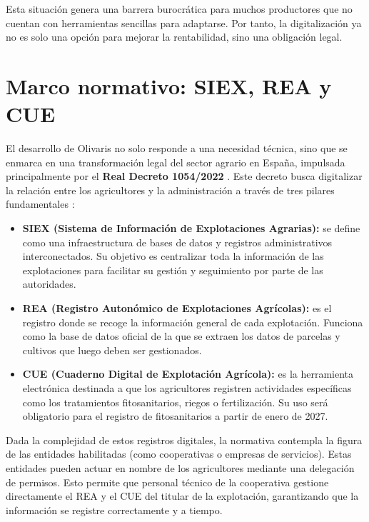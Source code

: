Esta situación genera una barrera burocrática para muchos productores que no cuentan con herramientas sencillas para adaptarse. Por tanto, la digitalización ya no es solo una opción para 
mejorar la rentabilidad, sino una obligación legal.

\section{Marco normativo: SIEX, REA y CUE}

El desarrollo de Olivaris no solo responde a una necesidad técnica, sino que se enmarca en una transformación legal del sector agrario en España, impulsada principalmente por el \textbf{Real 
Decreto 1054/2022} \cite{rdBoe}. Este decreto busca digitalizar la relación entre los agricultores y la administración a través de tres pilares fundamentales \cite{anexosSIEX}:

\begin{itemize}
    \item \textbf{SIEX (Sistema de Información de Explotaciones Agrarias):} se define como una infraestructura de bases de datos y registros administrativos interconectados. Su objetivo es centralizar toda la 
    información de las explotaciones para facilitar su gestión y seguimiento por parte de las autoridades.

    \item \textbf{REA (Registro Autonómico de Explotaciones Agrícolas):} es el registro donde se recoge la información general de cada explotación. Funciona como la base de datos oficial de la que se extraen los 
    datos de parcelas y cultivos que luego deben ser gestionados.

    \item \textbf{CUE (Cuaderno Digital de Explotación Agrícola):} es la herramienta electrónica destinada a que los agricultores registren actividades específicas como los tratamientos fitosanitarios, riegos o 
    fertilización. Su uso será obligatorio para el registro de fitosanitarios a partir de enero de 2027.
\end{itemize}

Dada la complejidad de estos registros digitales, la normativa contempla la figura de las entidades habilitadas (como cooperativas o empresas de servicios). Estas entidades pueden actuar en nombre de los 
agricultores mediante una delegación de permisos. Esto permite que personal técnico de la cooperativa gestione directamente el REA y el CUE del titular de la explotación, garantizando que la información se registre 
correctamente y a tiempo.


